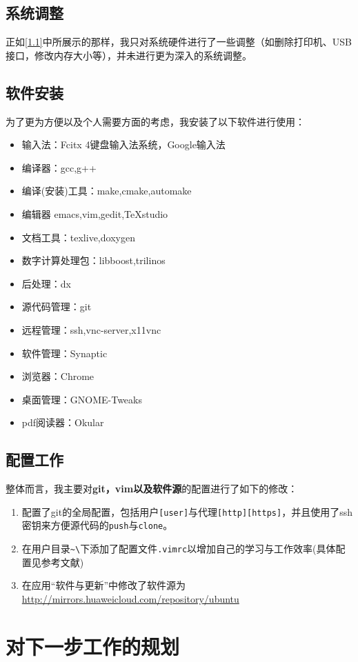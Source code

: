 \documentclass[a4paper]{ctexart}
\begin{document}
\subsection{系统调整}
正如\ref{1.1}中所展示的那样，我只对系统硬件进行了一些调整（如删除打印机、USB接口，修改内存大小等），并未进行更为深入的系统调整。
\subsection{软件安装}
为了更为方便以及个人需要方面的考虑，我安装了以下软件进行使用：
\begin{itemize}
	\item 输入法：Fcitx 4键盘输入法系统，Google输入法
	\item 编译器：gcc,g++
	\item 编译(安装)工具：make,cmake,automake
	\item 编辑器 emacs,vim,gedit,TeXstudio
	\item 文档工具：texlive,doxygen
	\item 数字计算处理包：libboost,trilinos
	\item 后处理：dx
	\item 源代码管理：git
	\item 远程管理：ssh,vnc-server,x11vnc
	\item 软件管理：Synaptic
	\item 浏览器：Chrome
	\item 桌面管理：GNOME-Tweaks
	\item pdf阅读器：Okular
\end{itemize}
\subsection{配置工作}
整体而言，我主要对{\bf git，vim以及软件源}的配置进行了如下的修改：
\begin{enumerate}
	\item 配置了git的全局配置，包括用户\verb|[user]|与代理\verb|[http][https]|，并且使用了ssh密钥来方便源代码的\verb|push|与\verb|clone|。
	\item 在用户目录\verb|~\|下添加了配置文件\verb|.vimrc|以增加自己的学习与工作效率(具体配置见参考文献\cite{linux_set})
	\item 在应用“软件与更新”中修改了软件源为\url{http://mirrors.huaweicloud.com/repository/ubuntu}
\end{enumerate}
\section{对下一步工作的规划}
\end{document}
